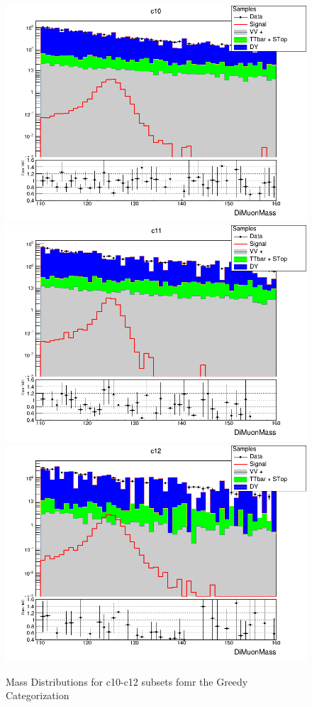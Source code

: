 \begin{figure}[H]
  \centering
  \includegraphics[width=0.65\linewidth]{figures/ch_higgs/distributions/bdt_uf/distribution__c10__DiMuonMass__logY.png}\\
  \includegraphics[width=0.65\linewidth]{figures/ch_higgs/distributions/bdt_uf/distribution__c11__DiMuonMass__logY.png}\\
  \includegraphics[width=0.65\linewidth]{figures/ch_higgs/distributions/bdt_uf/distribution__c12__DiMuonMass__logY.png}
  \caption{Mass Distributions for c10-c12 subsets fomr the Greedy Categorization}
  \label{fig:higgs_categorization_greedyc10c12}
\end{figure}

